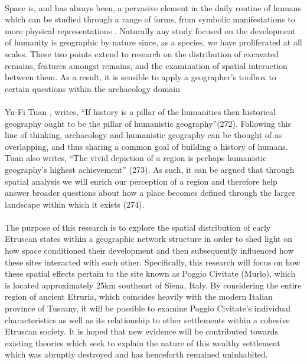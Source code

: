 \documentclass[12pt,a4paper]{thesis}
\begin{document}
\paragraph{}
Space is, and has always been, a pervasive  element in the daily routine of humans which can be studied through a range of forms, from symbolic manifestations to more physical representations \cite[p. 282]{Harvey06}. Naturally any study focused on the development of humanity is geographic by nature since, as a species, we have proliferated at all scales. These two points extend  to research on the distribution of excavated remains, features amongst remains, and the examination of spatial interaction between them. As a result, it is sensible to apply a geographer's toolbox to certain questions within the archaeology domain \cite[p. 39-42]{Kantner08}

\paragraph{}
Yu-Fi Tuan \citeyear{Tuan76}, writes, ``If history is a pillar of the humanities then historical geography ought to be the pillar of humanistic geography''(272). Following this line of thinking, archaeology and humanistic geography can be thought of as overlapping, and thus sharing a common goal of building a history of humans. Tuan also writes, ``The vivid depiction of a region is perhaps humanistic geography's highest achievement'' (273). As such, it can be argued that through spatial analysis we will enrich our perception of a region and therefore help answer broader questions about how a place becomes defined through the larger landscape within which it exists (274).

\paragraph{} 
The purpose of this research is to explore the spatial distribution of early Etruscan states within a geographic network structure in order to shed light on how space conditioned their development  and then subsequently influenced how these sites interacted with each other. Specifically, this research will focus on how these spatial effects  pertain to the site known as Poggio Civitate (Murlo), which is located approximately 25km southeast of Siena, Italy. By considering the entire region of ancient Etruria, which coincides heavily with the modern Italian province of Tuscany, it will be possible to examine Poggio Civitate's individual characteristics as well as its relationship to other settlements within a cohesive Etruscan society. It is hoped that new evidence will be contributed towards existing theories which seek to explain the nature of this wealthy settlement which was abruptly destroyed and has henceforth remained uninhabited.
\end{document}
